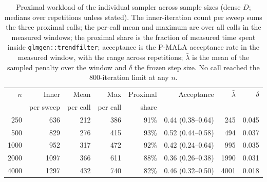 \begin{table}[!htbp]
\centering
\small
\caption{Proximal workload of the individual sampler across sample sizes (dense $D$; medians over repetitions unless stated). The inner-iteration count per sweep sums the three proximal calls; the per-call mean and maximum are over all calls in the measured windows; the proximal share is the fraction of measured time spent inside \texttt{glmgen::trendfilter}; acceptance is the P-MALA acceptance rate in the measured window, with the range across repetitions; $\bar\lambda$ is the mean of the sampled penalty over the window and $\delta$ the frozen step size. No call reached the $800$-iteration limit at any $n$.}
\label{tab:prox_workload}
\begin{tabular}{rrrrrrrr}
\toprule
$n$ & Inner & Mean & Max & Proximal & Acceptance & $\bar\lambda$ & $\delta$ \\
 & per sweep & per call & per call & share & & & \\
\midrule
250 & 636 & 212 & 386 & 91\% & 0.44 (0.38--0.64) & 245 & 0.045 \\
500 & 829 & 276 & 415 & 93\% & 0.52 (0.44--0.58) & 494 & 0.037 \\
1000 & 952 & 317 & 472 & 92\% & 0.42 (0.24--0.64) & 995 & 0.035 \\
2000 & 1097 & 366 & 611 & 88\% & 0.36 (0.26--0.38) & 1990 & 0.031 \\
4000 & 1297 & 432 & 740 & 82\% & 0.46 (0.32--0.50) & 4001 & 0.018 \\
\bottomrule
\end{tabular}
\end{table}

